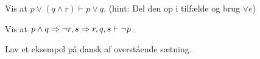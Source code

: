 \begin{exercise}
    Vis at $p \lor (q \land r) \vdash p \lor q$.
    (hint: Del den op i tilfælde og brug $\lor e$)
\end{exercise}

\begin{exercise}
    Vis at $p \land q \Rightarrow \lnot r, s \Rightarrow r, q, s \vdash \lnot p$.
\end{exercise}

\begin{exercise}
    Lav et eksempel på dansk af overstående sætning.
\end{exercise}

\ifdefined\startUdsagnslogik\fi
